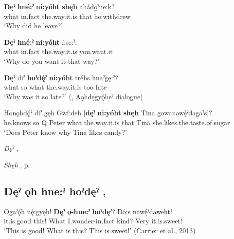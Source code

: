\ea
\label{ex:dpart16}
\gll \textbf{Dęˀ} \textbf{hné:ˀ} \textbf{ni:yóht} \textbf{shęh} ahádo̱ˀne:k? \\
what in.fact the.way.it.is that he.withdrew\\
\glt ‘Why did he leave?’
\z

\ea
\label{ex:dpart17}
\gll \textbf{Dęˀ} \textbf{hné:ˀ} \textbf{ni:yóht} í:se:ˀ. \\
what in.fact the.way.it.is you.want.it\\
\glt ‘Why do you want it that way?’
\z

\ea
\label{ex:dpart18}
\gll \textbf{Dęˀ} diˀ \textbf{hoˀdę́ˀ} \textbf{ni:yóht} tréhs hnaˀgę:ˀ? \\
what so what the.way.it.is too late\\
\glt ‘Why was it so late?’ (\cite[508]{mithun_watewayestanih_1984}, Aǫhdęgyǫ́heˀ dialogue)
\z

\ea
\label{ex:dpart19}
\gll Honǫhdǫ́ˀ diˀ gęh Gwí:deh [\textbf{dęˀ} \textbf{ni:yóht} \textbf{shęh} Tina gowanawę́ˀdagaˀs]? \\
he.knows so Q Peter what the.way.it.is that Tina she.likes.the.taste.of.sugar\\
\glt ‘Does Peter know why Tina likes candy?’
\z

\begin{CayugaRelated}
\item\textit{Dęˀ} ,  \pageref{p:[dęˀ-]}\\
\item\textit{Shęh} , p. \pageref{p:[shęh] `because’}
\end{CayugaRelated}


\subsection*{\textbf{Dęˀ ǫh hne:ˀ hoˀdęˀ} , } \label{p:[dęˀ ǫh hne:ˀ hoˀdęˀ]}

\ea
\label{ex:dpart39}
\gll Ogaˀǫ́h nę́:gyęh! \textbf{Dęˀ} \textbf{ǫ-hne:ˀ} \textbf{hoˀdęˀ}? Dó:s nawę́ˀdaweht! \\
it.is.good this! What I.wonder-in.fact kind? Very it.is.sweet! \\
\glt ‘This is good! What is this? This is sweet!’ (Carrier et al., 2013)
\z

